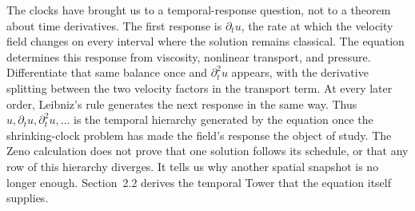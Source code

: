 The clocks have brought us to a temporal-response question, not to a theorem about time derivatives.
The first response is \(\partial_tu\), the rate at which the velocity field changes on every interval where the solution remains classical.
The \NavierStokes{} equation determines this response from viscosity, nonlinear transport, and pressure.
Differentiate that same balance once and \(\partial_t^2u\) appears, with the derivative splitting between the two velocity factors in the transport term.
At every later order, Leibniz's rule generates the next response in the same way.
Thus \(u,\partial_tu,\partial_t^2u,\ldots\) is the temporal hierarchy generated by the equation once the shrinking-clock problem has made the field's response the object of study.
The Zeno calculation does not prove that one solution follows its schedule, or that any row of this hierarchy diverges.
It tells us why another spatial snapshot is no longer enough.
Section~2.2 derives the temporal Tower that the equation itself supplies.
